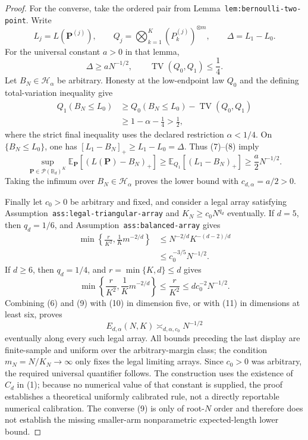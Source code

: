 \documentclass{article}
\begin{document}
\begin{proof}
For the converse, take the ordered pair from Lemma~\texttt{lem:bernoulli-two-point}.  Write
\[
L_j=L(\mathbf P^{(j)}),
\qquad
Q_j=\bigotimes_{k=1}^K(P_k^{(j)})^{\otimes m},
\qquad
\Delta=L_1-L_0.
\]
For the universal constant \(a>0\) in that lemma,
\[
\Delta\ge aN^{-1/2},
\qquad
\operatorname{TV}(Q_0,Q_1)\le\frac14.
\tag{7}
\]
Let \(B_N\in\mathcal H_\alpha\) be arbitrary.  Honesty at the low-endpoint law \(Q_0\) and the defining total-variation inequality give
\[
\begin{aligned}
Q_1(B_N\le L_0)
&\ge Q_0(B_N\le L_0)-\operatorname{TV}(Q_0,Q_1)\\
&\ge1-\alpha-\frac14
>\frac12,
\end{aligned}
\tag{8}
\]
where the strict final inequality uses the declared restriction \(\alpha<1/4\).  On \(\{B_N\le L_0\}\), one has \([L_1-B_N]_+\ge L_1-L_0=\Delta\).  Thus (7)--(8) imply
\[
\sup_{\mathbf P\in\mathcal P(\mathbb B_d)^K}
\mathbb E_{\mathbf P}\!\left[(L(\mathbf P)-B_N)_+\right]
\ge\mathbb E_{Q_1}\!\left[(L_1-B_N)_+\right]
\ge\frac a2N^{-1/2}.
\tag{9}
\]
Taking the infimum over \(B_N\in\mathcal H_\alpha\) proves the lower bound with \(c_{d,\alpha}=a/2>0\).

Finally let \(c_0>0\) be arbitrary and fixed, and consider a legal array satisfying Assumption~\texttt{ass:legal-triangular-array} and \(K_N\ge c_0N^{q_d}\) eventually.  If \(d=5\), then \(q_d=1/6\), and Assumption~\texttt{ass:balanced-array} gives
\[
\begin{aligned}
\min\left\{\frac r{K^2},\frac1K m^{-2/d}\right\}
&\le N^{-2/d}K^{-(d-2)/d}\\
&\le c_0^{-3/5}N^{-1/2}.
\end{aligned}
\tag{10}
\]
If \(d\ge6\), then \(q_d=1/4\), and \(r=\min\{K,d\}\le d\) gives
\[
\min\left\{\frac r{K^2},\frac1K m^{-2/d}\right\}
\le\frac r{K^2}
\le d c_0^{-2}N^{-1/2}.
\tag{11}
\]
Combining (6) and (9) with (10) in dimension five, or with (11) in dimensions at least six, proves
\[
E_{d,\alpha}(N,K)\asymp_{d,\alpha,c_0}N^{-1/2}
\]
eventually along every such legal array.  All bounds preceding the last display are finite-sample and uniform over the arbitrary-margin class; the condition \(m_N=N/K_N\to\infty\) only fixes the legal limiting arrays.  Since \(c_0>0\) was arbitrary, the required universal quantifier follows.  The construction uses the existence of \(C_d\) in (1); because no numerical value of that constant is supplied, the proof establishes a theoretical uniformly calibrated rule, not a directly reportable numerical calibration.  The converse (9) is only of root-\(N\) order and therefore does not establish the missing smaller-arm nonparametric expected-length lower bound.
\end{proof}
\end{document}
